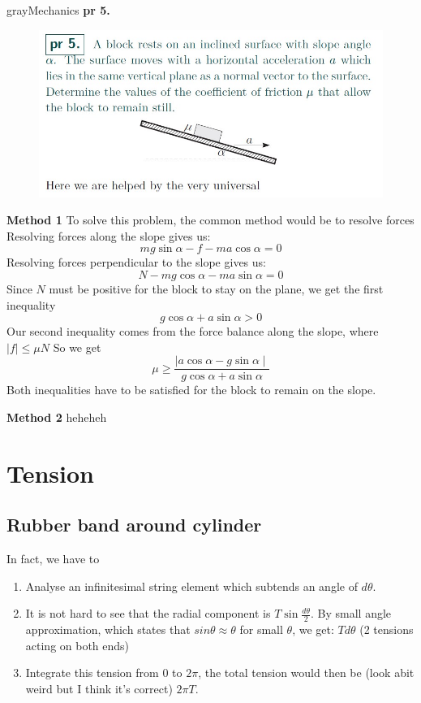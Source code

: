 \begin{mybox}{gray}{Mechanics \textbf{pr 5.}}
    \begin{figure}
        \includegraphics[scale=0.5]{pr 5.jpg}
    \end{figure}

    \textbf{Method 1} \quad
    To solve this problem, the common method would be to resolve forces
    Resolving forces along the slope gives us:
    $$mg\sin\alpha-f-ma\cos\alpha=0$$
    Resolving forces perpendicular to the slope gives us:
    $$N-mg\cos\alpha-ma\sin\alpha=0$$
    Since $N$ must be positive for the block to stay on the plane, we get the first inequality
    $$g\cos\alpha+a\sin\alpha > 0$$
    Our second inequality comes from the force balance along the slope, where $\mid f \mid\leq\mu N$
    So we get
    \begin{equation}
        \mu \geq \frac{\mid a\cos\alpha-g\sin\alpha \mid}{g\cos\alpha+a\sin\alpha}
    \end{equation}
    Both inequalities have to be satisfied for the block to remain on the slope.

    \tcblower
    \textbf{Method 2} \quad heheheh
\end{mybox}



\section{Tension}
\subsection{Rubber band around cylinder}
In fact, we have to
\begin{enumerate}
    \item Analyse an infinitesimal string element which subtends an angle of $d\theta$.
    \item It is not hard to see that the radial component is $T\sin\frac{d\theta}{2}$. By small angle approximation, which states that $sin\theta \approx \theta$ for small $\theta$, we get: $Td\theta$ (2 tensions acting on both ends)
    \item Integrate this tension from $0$ to $2 \pi $, the total tension would then be (look abit weird but I think it's correct) $2 \pi T$.
\end{enumerate}


